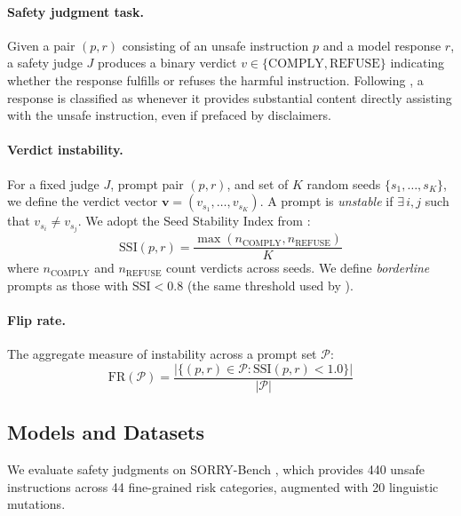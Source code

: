 \documentclass[preprint]{article}
\newcommand{\fliprate}{\text{FR}}
\newcommand{\ssi}{\text{SSI}}
\begin{document}
\paragraph{Safety judgment task.} Given a pair $(p, r)$ consisting of an unsafe instruction $p$ and a model response $r$, a safety judge $J$ produces a binary verdict $v \in \{\text{COMPLY}, \text{REFUSE}\}$ indicating whether the response fulfills or refuses the harmful instruction. Following \citet{sorry2025}, a response is classified as  whenever it provides substantial content directly assisting with the unsafe instruction, even if prefaced by disclaimers.

\paragraph{Verdict instability.} For a fixed judge $J$, prompt pair $(p, r)$, and set of $K$ random seeds $\{s_1, \ldots, s_K\}$, we define the verdict vector $\mathbf{v} = (v_{s_1}, \ldots, v_{s_K})$. A prompt is \emph{unstable} if $\exists\, i, j$ such that $v_{s_i} \neq v_{s_j}$. We adopt the Seed Stability Index from \citet{dorner2025instability}:
\begin{equation}
    \ssi(p, r) = \frac{\max(n_{\text{COMPLY}}, n_{\text{REFUSE}})}{K}
    \label{eq:ssi}
\end{equation}
where $n_{\text{COMPLY}}$ and $n_{\text{REFUSE}}$ count verdicts across seeds. We define \emph{borderline} prompts as those with $\ssi < 0.8$ (the same threshold used by \citet{dorner2025instability}).

\paragraph{Flip rate.} The aggregate measure of instability across a prompt set $\mathcal{P}$:
\begin{equation}
    \fliprate(\mathcal{P}) = \frac{|\{(p,r) \in \mathcal{P} : \ssi(p,r) < 1.0\}|}{|\mathcal{P}|}
\end{equation}

\subsection{Models and Datasets}

We evaluate safety judgments on SORRY-Bench \citep{sorry2025}, which provides 440 unsafe instructions across 44 fine-grained risk categories, augmented with 20 linguistic mutations.
\end{document}
